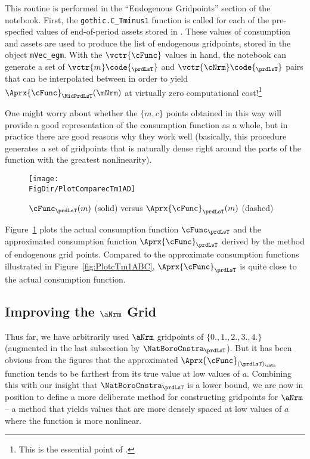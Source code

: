 \documentclass[\econtexRoot/SolvingMicroDSOPs]{subfiles}
\begin{document}
This routine is performed in the ``Endogenous Gridpoints'' section of the notebook. First, the \texttt{gothic.C\_Tminus1} function is called for each of the pre-specfied values of end-of-period assets stored in . These values of consumption and assets are used to produce the list of endogenous gridpoints, stored in the object \texttt{mVec\_egm}. With the $\vctr{\cFunc}$ values in hand, the notebook can generate a set of $\vctr{m}\code{_{\prdLsT}}$ and ${\vctr{\cNrm}\code{_{\prdLsT}}}$ pairs that can be interpolated between in order to yield $\Aprx{\cFunc}_{\MidPrdLsT}(\mNrm)$ at virtually zero computational cost!\footnote{This is the essential point of \cite{carrollEGM}.} %

\hypertarget{PlotComparecTm1AD}{}
One might worry about whether the $\{{m},c\}$ points obtained in this way will provide a good representation of the consumption function as a whole, but in practice there are good reasons why they work well (basically, this procedure generates a set of gridpoints that is naturally dense right around the parts of the function with the greatest nonlinearity).
\begin{figure}
  \centerline{\texttt{[image: \\FigDir/PlotComparecTm1AD]}}
  \caption{$\cFunc_{\prdLsT}(m)$ (solid) versus $\Aprx{\cFunc}_{\prdLsT}(m)$ (dashed)}
  \label{fig:ComparecTm1AD}
\end{figure}
Figure~\ref{fig:ComparecTm1AD} plots the actual consumption function $\cFunc_{\prdLsT}$ and the approximated consumption function $\Aprx{\cFunc}_{\prdLsT}$ derived by the method of endogenous grid points. Compared to the approximate consumption functions illustrated in Figure~\ref{fig:PlotcTm1ABC}, $\Aprx{\cFunc}_{\prdLsT}$ is quite close to the actual consumption function.



\hypertarget{improving-the-a-grid}{}
\subsection{Improving the $\aNrm$ Grid}\label{subsec:improving-the-a-grid}

Thus far, we have arbitrarily used $\aNrm$ gridpoints of $\{0.,1.,2.,3.,4.\}$ (augmented in the last subsection by $\NatBoroCnstra_{\prdLsT}$).  But it has been obvious from the figures that the approximated $\Aprx{\cFunc}_{(\prdLsT)_\cntn}$ function tends to be farthest from its true value at low values of $a$.  Combining this with our insight that $\NatBoroCnstra_{\prdLsT}$ is a lower bound, we are now in position to define a more deliberate method for constructing gridpoints for $\aNrm$ -- a method that yields values that are more densely spaced at low values of $a$ where the function is more nonlinear.
\end{document}
